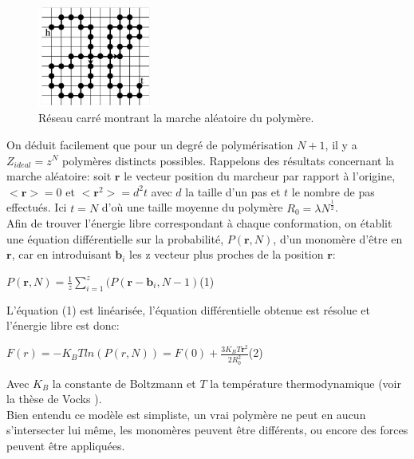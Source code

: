 \documentclass[a4paper,11pt]{article}
\begin{document}
\begin{figure}[H]
\begin{center}
\includegraphics[width=0.33\textwidth]{resideal.jpg}

\caption{Réseau carré montrant la marche aléatoire du polymère.}
\label{resideal}
\end{center}
\end{figure}

On déduit facilement que pour un degré de polymérisation $N+1$, il y a $Z_{ideal}=z^N$ polymères distincts possibles. Rappelons des résultats concernant la marche aléatoire: soit $\textbf{r}$ le vecteur position du marcheur par rapport à l'origine, $<\textbf{r}>=0$ et $<\textbf{r}^2>=d^2 t$ avec $d$ la taille d'un pas et $t$ le nombre de pas effectués. Ici $t=N$ d'où une taille moyenne du polymère $R_0=\lambda N^{\frac{1}{2}}$.\\

Afin de trouver l'énergie libre correspondant à chaque conformation, on établit une équation différentielle sur la probabilité, $P(\textbf{r},N)$, d'un monomère d'être en $\textbf{r}$, car en introduisant $\textbf{b}_i$ les z vecteur plus proches de la position $\textbf{r}$:
\begin{center}

$P(\textbf{r},N)= \frac{1}{z}\sum_{i=1}^{z} (P(\textbf{r}-\textbf{b}_i,N-1)$\flushright(1)

\end{center}

L'équation (1) est linéarisée, l'équation différentielle obtenue est résolue et l'énergie libre est donc:
\begin{center}

$F(r) = -K_B T ln(P(r,N)) = F(0) + \frac{3 K_B T \textbf{r}^2}{2 R_0^2}$\flushright(2)

\end{center}
Avec $K_B$ la constante de Boltzmann et $T$ la température thermodynamique (voir la thèse de Vocks \cite{these}).\\

Bien entendu ce modèle est simpliste, un vrai polymère ne peut en aucun s'intersecter lui même, les monomères peuvent être différents, ou encore des forces peuvent être appliquées.\\
\end{document}
